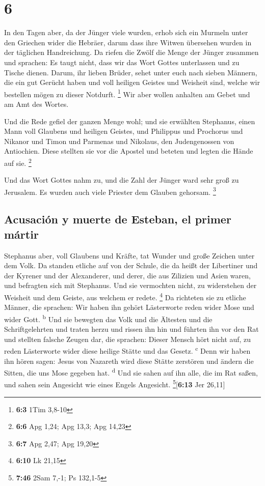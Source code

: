 \hypertarget{section-5}{%
\section{6}\label{section-5}}

 In den Tagen aber, da der Jünger viele wurden, erhob sich
ein Murmeln unter den Griechen wider die Hebräer, darum dass ihre Witwen
übersehen wurden in der täglichen Handreichung.  Da riefen
die Zwölf die Menge der Jünger zusammen und sprachen: Es taugt nicht,
dass wir das Wort Gottes unterlassen und zu Tische dienen.
 Darum, ihr lieben Brüder, sehet unter euch nach sieben
Männern, die ein gut Gerücht haben und voll heiligen Geistes und
Weisheit sind, welche wir bestellen mögen zu dieser Notdurft.
\footnote{\textbf{6:3} 1Tim 3,8-10}  Wir aber wollen
anhalten am Gebet und am Amt des Wortes.

 Und die Rede gefiel der ganzen Menge wohl; und sie
erwählten Stephanus, einen Mann voll Glaubens und heiligen Geistes, und
Philippus und Prochorus und Nikanor und Timon und Parmenas und Nikolaus,
den Judengenossen von Antiochien.  Diese stellten sie vor
die Apostel und beteten und legten die Hände auf sie. \footnote{\textbf{6:6}
  Apg 1,24; Apg 13,3; Apg 14,23}

 Und das Wort Gottes nahm zu, und die Zahl der Jünger ward
sehr groß zu Jerusalem. Es wurden auch viele Priester dem Glauben
gehorsam. \footnote{\textbf{6:7} Apg 2,47; Apg 19,20}

\hypertarget{acusaciuxf3n-y-muerte-de-esteban-el-primer-muxe1rtir}{%
\subsection{Acusación y muerte de Esteban, el primer
mártir}\label{acusaciuxf3n-y-muerte-de-esteban-el-primer-muxe1rtir}}

 Stephanus aber, voll Glaubens und Kräfte, tat Wunder und
große Zeichen unter dem Volk.  Da standen etliche auf von
der Schule, die da heißt der Libertiner und der Kyrener und der
Alexanderer, und derer, die aus Zilizien und Asien waren, und befragten
sich mit Stephanus.  Und sie vermochten nicht, zu
widerstehen der Weisheit und dem Geiste, aus welchem er redete.
\footnote{\textbf{6:10} Lk 21,15}  Da richteten sie zu
etliche Männer, die sprachen: Wir haben ihn gehört Lästerworte reden
wider Mose und wider Gott. \textsuperscript{b}  Und sie
bewegten das Volk und die Ältesten und die Schriftgelehrten und traten
herzu und rissen ihn hin und führten ihn vor den Rat  und
stellten falsche Zeugen dar, die sprachen: Dieser Mensch hört nicht auf,
zu reden Lästerworte wider diese heilige Stätte und das Gesetz.
\textsuperscript{c}  Denn wir haben ihn hören sagen:
Jesus von Nazareth wird diese Stätte zerstören und ändern die Sitten,
die uns Mose gegeben hat. \textsuperscript{d}  Und sie
sahen auf ihn alle, die im Rat saßen, und sahen sein Angesicht wie eines
Engels Angesicht. \footnote{\textbf{7:46} 2Sam 7,-1; Ps 132,1-5}{[}\textbf{6:13}
Jer 26,11{]}

